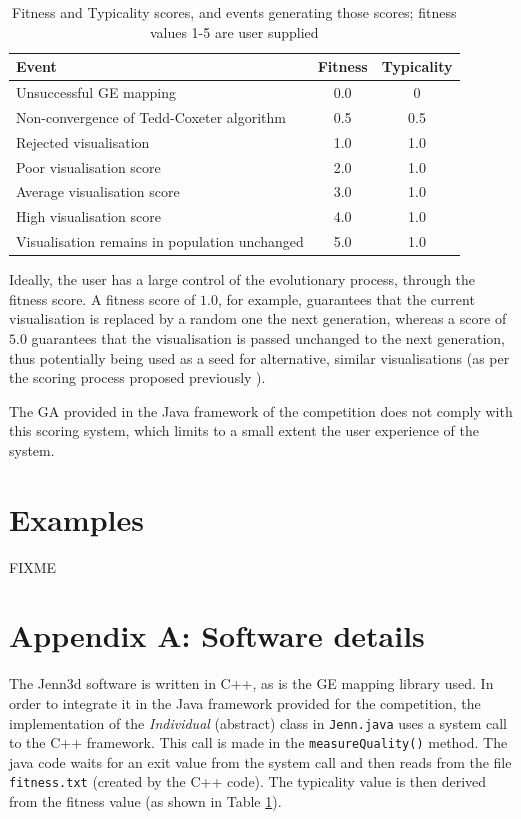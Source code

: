 \documentclass{article}
\begin{document}
\begin{center}
	\begin{table}
	\caption{Fitness and Typicality scores, and events generating those
	scores; fitness values 1-5 are user supplied}
	\begin{tabular}{|l|c|c|}
		\hline
		Event & Fitness & Typicality\\
		\hline
		Unsuccessful GE mapping & 0.0 & 0\\
		\hline
		Non-convergence of Tedd-Coxeter algorithm & 0.5 & 0.5\\
		\hline
		Rejected visualisation & 1.0 & 1.0\\
		\hline
		Poor visualisation score & 2.0 & 1.0\\
		\hline
		Average visualisation score & 3.0 & 1.0\\
		\hline
		High visualisation score & 4.0 & 1.0\\
		\hline
		Visualisation remains in population unchanged & 5.0 & 1.0\\
		\hline
	\end{tabular}
	\label{fittyp}
	\end{table}
\end{center}

Ideally, the user has a large control of the evolutionary process, through the
fitness score. A fitness score of $1.0$, for example, guarantees that the
current visualisation is replaced by a random one the next generation, whereas
a score of $5.0$ guarantees that the visualisation is passed unchanged to the
next generation, thus potentially being used as a seed for alternative, similar
visualisations (as per the scoring process proposed previously
\cite{nicolau2011a}).

The GA provided in the Java framework of the competition does not comply with
this scoring system, which limits to a small extent the user experience of the
system.

\section{Examples}
FIXME




\section*{Appendix A: Software details}

The Jenn3d software is written in C++, as is the GE mapping library used. In
order to integrate it in the Java framework provided for the competition, the
implementation of the \textit{Individual} (abstract) class in \texttt{Jenn.java} uses 
a system call to the C++ framework. This call is made in the \texttt{measureQuality()} 
method. The java code waits for an exit value from the system call and then reads 
from the file \texttt{fitness.txt} (created by the C++ code). The typicality value is then 
derived from the fitness value (as shown in Table \ref{fittyp}).
\end{document}
